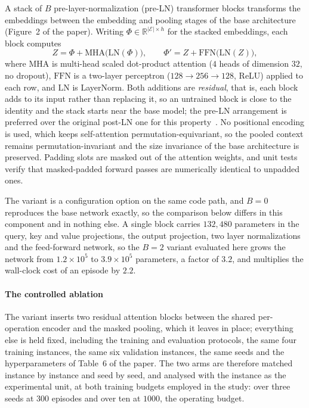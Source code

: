 \documentclass[preprint,12pt]{elsarticle}
\begin{document}
A stack of $B$ pre-layer-normalization (pre-LN) transformer blocks
transforms the embeddings between the embedding and pooling stages of
the base architecture (Figure~2 of the paper). Writing
$\Phi\in\mathbb{R}^{|\mathcal{E}|\times h}$ for the stacked
embeddings, each block computes
\begin{equation}
\label{sup:eq-attnblock}
Z=\Phi+\mathrm{MHA}\big(\mathrm{LN}(\Phi)\big),\qquad
\Phi'=Z+\mathrm{FFN}\big(\mathrm{LN}(Z)\big),
\end{equation}
where $\mathrm{MHA}$ is multi-head scaled dot-product attention ($4$
heads of dimension $32$, no dropout), $\mathrm{FFN}$ is a two-layer
perceptron ($128\to256\to128$, ReLU) applied to each row, and
$\mathrm{LN}$ is LayerNorm. Both additions are \emph{residual}, that
is, each block adds to its input rather than replacing it, so an
untrained block is close to the identity and the stack starts near
the base model; the pre-LN arrangement is preferred over the original
post-LN one for this property~\citep{Xiong2020}. No positional
encoding is used, which keeps self-attention
permutation-equivariant, so the pooled context remains
permutation-invariant and the size invariance of the base
architecture is preserved. Padding slots are masked out of the
attention weights, and unit tests verify that masked-padded forward
passes are numerically identical to unpadded ones.

The variant is a configuration option on the same code path, and
$B{=}0$ reproduces the base network exactly, so the comparison below
differs in this component and in nothing else. A single block carries
$132{,}480$ parameters in the query, key and value projections, the
output projection, two layer normalizations and the feed-forward
network, so the $B{=}2$ variant evaluated here grows the network from
$1.2\times10^{5}$ to $3.9\times10^{5}$ parameters, a factor of
$3.2$, and multiplies the wall-clock cost of an episode by $2.2$.

\paragraph{The controlled ablation} The variant inserts two residual
attention blocks between the shared per-operation encoder and the
masked pooling, which it leaves in place; everything else is held
fixed, including the training and evaluation protocols, the same four
training instances, the same six validation instances, the same seeds
and the hyperparameters of Table~6 of the paper. The two arms are
therefore matched instance by instance and seed by seed, and analysed
with the instance as the experimental unit, at both training budgets
employed in the study: over three seeds at $300$ episodes and over
ten at $1000$, the operating budget.
\end{document}
